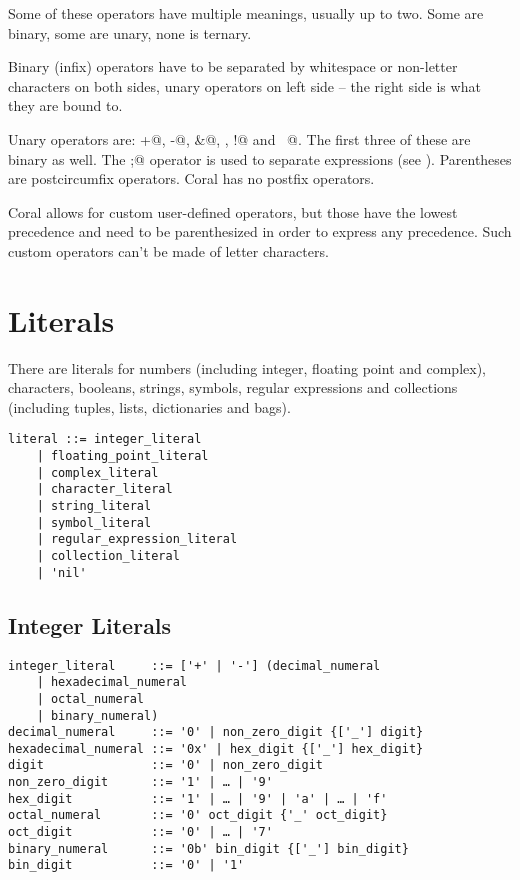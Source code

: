 Some of these operators have multiple meanings, usually up to two. Some are binary, some are unary, none is ternary. 

Binary (infix) operators have to be separated by whitespace or non-letter characters on both sides, unary operators on left side – the right side is what they are bound to. 

Unary operators are: \lstinline@+@, \lstinline@-@, \lstinline@&@, \lstinline@not@, \lstinline@!@ and \lstinline@~@. The first three of these are binary as well. The \lstinline@;@ operator is used to separate expressions (see ). Parentheses are postcircumfix operators. Coral has no postfix operators. 

Coral allows for custom user-defined operators, but those have the lowest precedence and need to be parenthesized in order to express any precedence. Such custom operators can't be made of letter characters. 

\section{Literals}\label{sec:literals}

There are literals for numbers (including integer, floating point and complex), characters, booleans, strings, symbols, regular expressions and collections (including tuples, lists, dictionaries and bags). 

\syntax\begin{lstlisting}
literal ::= integer_literal
	| floating_point_literal
	| complex_literal
	| character_literal
	| string_literal
	| symbol_literal
	| regular_expression_literal
	| collection_literal
	| 'nil'
\end{lstlisting}

\subsection{Integer Literals}\label{sec:integerliterals}

\syntax\begin{lstlisting}
integer_literal     ::= ['+' | '-'] (decimal_numeral
	| hexadecimal_numeral
	| octal_numeral
	| binary_numeral)
decimal_numeral     ::= '0' | non_zero_digit {['_'] digit}
hexadecimal_numeral ::= '0x' | hex_digit {['_'] hex_digit}
digit               ::= '0' | non_zero_digit
non_zero_digit      ::= '1' | … | '9'
hex_digit           ::= '1' | … | '9' | 'a' | … | 'f'
octal_numeral       ::= '0' oct_digit {'_' oct_digit}
oct_digit           ::= '0' | … | '7'
binary_numeral      ::= '0b' bin_digit {['_'] bin_digit}
bin_digit           ::= '0' | '1'
\end{lstlisting}

